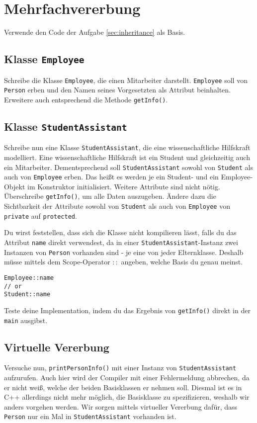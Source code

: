 \section{Mehrfachvererbung}
Verwende den Code der Aufgabe \ref{sec:inheritance} als Basis.

\subsection{Klasse \texttt{Employee}}
Schreibe die Klasse \texttt{Employee}, die einen Mitarbeiter darstellt.
\texttt{Employee} soll von \texttt{Person} erben und den Namen seines Vorgesetzten als Attribut beinhalten.
Erweitere auch entsprechend die Methode \texttt{getInfo()}.

\subsection{Klasse \texttt{StudentAssistant}}
Schreibe nun eine Klasse \texttt{StudentAssistant}, die eine wissenschaftliche Hilfskraft modelliert.
Eine wissenschaftliche Hilfskraft ist ein Student und gleichzeitig auch ein Mitarbeiter.
Dementsprechend soll \texttt{StudentAssistant} sowohl von \texttt{Student} als auch von \texttt{Employee} erben. Das heißt es werden je ein Student- und ein Employee-Objekt im Konstruktor initialisiert.
Weitere Attribute sind nicht nötig.
Überschreibe \texttt{getInfo()}, um alle Daten auszugeben.
Ändere dazu die Sichtbarkeit der Attribute sowohl von \texttt{Student} als auch von \texttt{Employee} von \texttt{private} auf \texttt{protected}.

Du wirst feststellen, dass sich die Klasse nicht kompilieren lässt, falls du das Attribut \texttt{name} direkt verwendest, da in einer \texttt{StudentAssistant}-Instanz zwei Instanzen von \texttt{Person} vorhanden sind - je eine von jeder Elternklasse. Deshalb müsse mittels dem Scope-Operator $::$ angeben, welche Basis du genau meinst.
\begin{lstlisting}
Employee::name
// or
Student::name
\end{lstlisting}

Teste deine Implementation, indem du das Ergebnis von \texttt{getInfo()} direkt in der \texttt{main} ausgibst.

\subsection{Virtuelle Vererbung}
Versuche nun, \texttt{printPersonInfo()} mit einer Instanz von \texttt{StudentAssistant} aufzurufen. Auch hier wird der Compiler mit einer Fehlermeldung abbrechen, da er nicht weiß, welche der beiden Basisklassen er nehmen soll.
Diesmal ist es in C++ allerdings nicht mehr möglich, die Basisklasse zu spezifizieren, weshalb wir anders vorgehen werden.
Wir sorgen mittels virtueller Vererbung dafür, dass \texttt{Person} nur ein Mal in \texttt{StudentAssistant} vorhanden ist.

